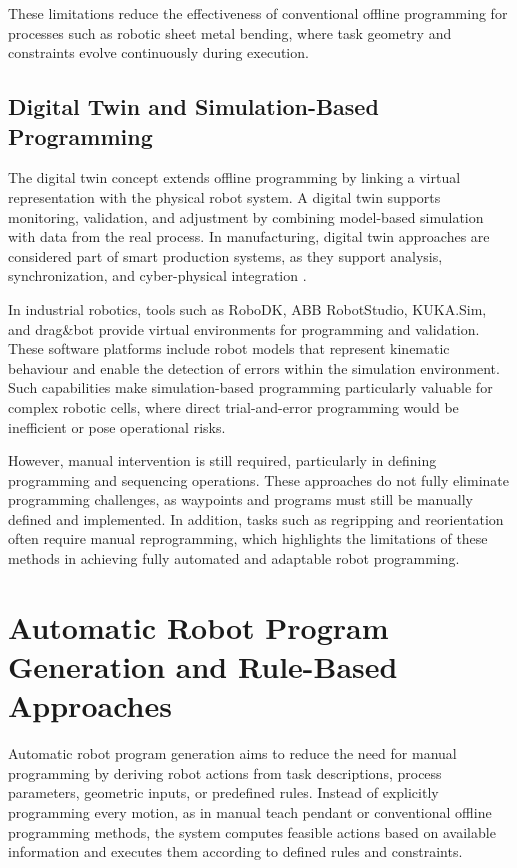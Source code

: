 These limitations reduce the effectiveness of conventional offline programming for processes such as robotic sheet metal bending, where task geometry and constraints evolve continuously during execution.

\subsection{Digital Twin and Simulation-Based Programming}
\label{subsec:digital-twin-simulation-programming}

The digital twin concept extends offline programming by linking a virtual representation with the physical robot system. A digital twin supports monitoring, validation, and adjustment by combining model-based simulation with data from the real process. In manufacturing, digital twin approaches are considered part of smart production systems, as they support analysis, synchronization, and cyber-physical integration \cite{Tao2021DigitalTwin}.

In industrial robotics, tools such as RoboDK, ABB RobotStudio, KUKA.Sim, and drag\&bot provide virtual environments for programming and validation. These software platforms include robot models that represent kinematic behaviour and enable the detection of errors within the simulation environment. Such capabilities make simulation-based programming particularly valuable for complex robotic cells, where direct trial-and-error programming would be inefficient or pose operational risks.

However, manual intervention is still required, particularly in defining programming and sequencing operations. These approaches do not fully eliminate programming challenges, as waypoints and programs must still be manually defined and implemented. In addition, tasks such as regripping and reorientation often require manual reprogramming, which highlights the limitations of these methods in achieving fully automated and adaptable robot programming.


\section{Automatic Robot Program Generation and Rule-Based Approaches}
\label{sec:automatic-robot-program-generation-rule-based}

Automatic robot program generation aims to reduce the need for manual programming by deriving robot actions from task descriptions, process parameters, geometric inputs, or predefined rules. Instead of explicitly programming every motion, as in manual teach pendant or conventional offline programming methods, the system computes feasible actions based on available information and executes them according to defined rules and constraints.

